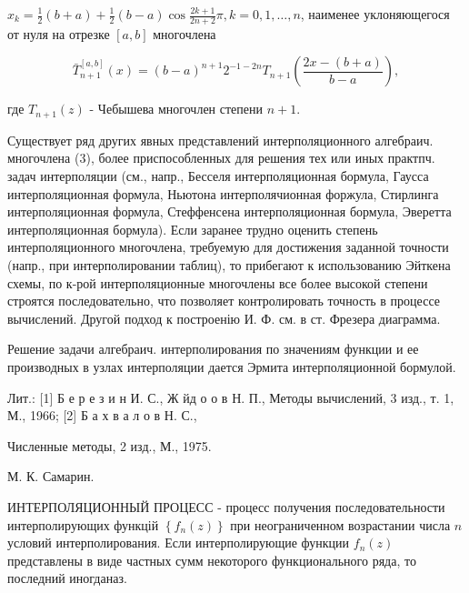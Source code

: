 \documentclass[10pt]{article}
\begin{document}
$x_{k}=\frac{1}{2}(b+a)+\frac{1}{2}(b-a) \cos \frac{2 k+1}{2 n+2} \pi, k=0,1, \ldots, n$, наименее уклоняющегося от нуля на отрезке $[a, b]$ многочлена



\[

\bar{T}_{n+1}^{[a, b]}(x)=(b-a)^{n+1} 2^{-1-2 n} T_{n+1}\left(\frac{2 x-(b+a)}{b-a}\right),

\]



где $T_{n+1}(z)$ - Чебышева многочлен степени $n+1$.



Существует ряд других явных представлений интерполяционного алгебраич. многочлена (3), более приспособленных для решения тех или иных практпч. задач интерполяции (см., напр., Бесселя интерполяционная бормула, Гаусса интерполяционная формула, Ньютона интерполячионная форжула, Стирлинга интерполяционная формула, Стеффенсена интерполяционная бормула, Эверетта интерполяционная бормула). Если заранее трудно оценить степень интерполяционного многочлена, требуемую для достижения заданной точности (напр., при интерполировании таблиц), то прибегают к использованию Эйткена схемы, по к-рой интерполяционные многочлены все более высокой степени строятся последовательно, что позволяет контролировать точность в процессе вычислений. Другой подход к построенію И. Ф. см. в ст. Фрезера диаграмма.



Решение задачи алгебраич. интерполирования по значениям функции и ее производных в узлах интерполяции дается Эрмита интерполяционной бормулой.



Лит.: [1] Б е р е з и н И. С., Ж йд о о в Н. П., Методы вычислений, 3 изд., т. 1, М., 1966; [2] Б а х в а л о в Н. С.,

Численные методы, 2 изд., М., 1975.

М. К. Самарин.



ИНТЕРПОЛЯЦИОННЫЙ ПРОЦЕСС - процесс получения последовательности интерполирующих функцій $\left\{f_{n}(z)\right\}$ при неограниченном возрастании числа $n$ условий интерполирования. Если интерполирующие функции $f_{n}(z)$ представлены в виде частных сумм некоторого функционального ряда, то последний иногданаз.
\end{document}
